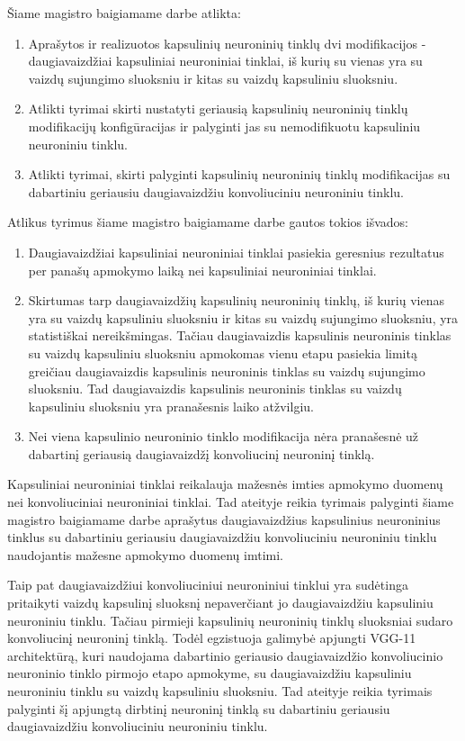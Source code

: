 
Šiame magistro baigiamame darbe atlikta:

\begin{enumerate}
	\item Aprašytos ir realizuotos kapsulinių neuroninių tinklų dvi modifikacijos - daugiavaizdžiai kapsuliniai neuroniniai tinklai, iš kurių su vienas yra su vaizdų sujungimo sluoksniu ir kitas su vaizdų kapsuliniu sluoksniu.
	\item Atlikti tyrimai skirti nustatyti geriausią kapsulinių neuroninių tinklų modifikacijų konfigūracijas ir palyginti jas su nemodifikuotu kapsuliniu neuroniniu tinklu.
	\item Atlikti tyrimai, skirti palyginti kapsulinių neuroninių tinklų modifikacijas su dabartiniu geriausiu daugiavaizdžiu konvoliuciniu neuroniniu tinklu.
\end{enumerate}

Atlikus tyrimus šiame magistro baigiamame darbe gautos tokios išvados:

\begin{enumerate}
	\item Daugiavaizdžiai kapsuliniai neuroniniai tinklai pasiekia geresnius rezultatus per panašų apmokymo laiką nei kapsuliniai neuroniniai tinklai.
	\item Skirtumas tarp daugiavaizdžių kapsulinių neuroninių tinklų, iš kurių vienas yra su vaizdų kapsuliniu sluoksniu ir kitas su vaizdų sujungimo sluoksniu, yra statistiškai nereikšmingas. Tačiau daugiavaizdis kapsulinis neuroninis tinklas su vaizdų kapsuliniu sluoksniu apmokomas vienu etapu pasiekia limitą greičiau daugiavaizdis kapsulinis neuroninis tinklas su vaizdų sujungimo sluoksniu. Tad daugiavaizdis kapsulinis neuroninis tinklas su vaizdų kapsuliniu sluoksniu yra pranašesnis laiko atžvilgiu.
	\item Nei viena kapsulinio neuroninio tinklo modifikacija nėra pranašesnė už dabartinį geriausią daugiavaizdžį konvoliucinį neuroninį tinklą.
\end{enumerate}

Kapsuliniai neuroniniai tinklai reikalauja mažesnės imties apmokymo duomenų nei konvoliuciniai neuroniniai tinklai. Tad ateityje reikia tyrimais palyginti šiame magistro baigiamame darbe aprašytus daugiavaizdžius kapsulinius neuroninius tinklus su dabartiniu geriausiu daugiavaizdžiu konvoliuciniu neuroniniu tinklu naudojantis mažesne apmokymo duomenų imtimi.

Taip pat daugiavaizdžiui konvoliuciniui neuroniniui tinklui yra sudėtinga pritaikyti vaizdų kapsulinį sluoksnį nepaverčiant jo daugiavaizdžiu kapsuliniu neuroniniu tinklu. Tačiau pirmieji kapsulinių neuroninių tinklų sluoksniai sudaro konvoliucinį neuroninį tinklą. Todėl egzistuoja galimybė apjungti VGG-11 architektūrą, kuri naudojama dabartinio geriausio daugiavaizdžio konvoliucinio neuroninio tinklo pirmojo etapo apmokyme, su daugiavaizdžiu kapsuliniu neuroniniu tinklu su vaizdų kapsuliniu sluoksniu. Tad ateityje reikia tyrimais palyginti šį apjungtą dirbtinį neuroninį tinklą su dabartiniu geriausiu daugiavaizdžiu konvoliuciniu neuroniniu tinklu.
